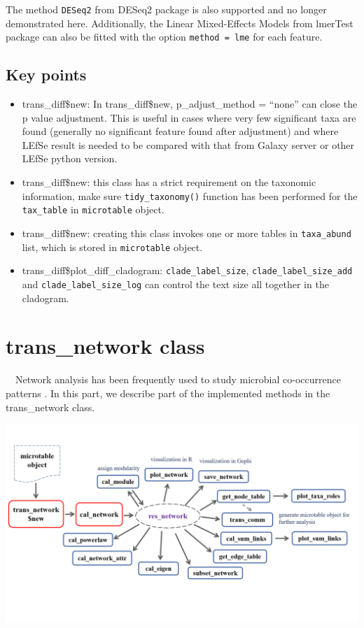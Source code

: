 \documentclass[
]{book}
\providecommand{\tightlist}{%
  \setlength{\itemsep}{0pt}\setlength{\parskip}{0pt}}
\begin{document}
The method \texttt{DESeq2} from DESeq2 package is also supported and no longer demonstrated here.
Additionally, the Linear Mixed-Effects Models from lmerTest package can also be fitted with the option \texttt{method\ =\ \textquotesingle{}lme\textquotesingle{}} for each feature.

\hypertarget{key-points-5}{%
\subsection{Key points}\label{key-points-5}}

\begin{itemize}
\tightlist
\item
  trans\_diff\$new: In trans\_diff\$new, p\_adjust\_method = ``none'' can close the p value adjustment.
  This is useful in cases where very few significant taxa are found (generally no significant feature found after adjustment) and
  where LEfSe result is needed to be compared with that from Galaxy server or other LEfSe python version.
\item
  trans\_diff\$new: this class has a strict requirement on the taxonomic information,
  make sure \texttt{tidy\_taxonomy()} function has been performed for the \texttt{tax\_table} in \texttt{microtable} object.
\item
  trans\_diff\$new: creating this class invokes one or more tables in \texttt{taxa\_abund} list, which is stored in \texttt{microtable} object.
\item
  trans\_diff\$plot\_diff\_cladogram: \texttt{clade\_label\_size}, \texttt{clade\_label\_size\_add} and \texttt{clade\_label\_size\_log} can control the text size all together in the cladogram.
\end{itemize}

\hypertarget{trans_network-class}{%
\section{trans\_network class}\label{trans_network-class}}

　Network analysis has been frequently used to study microbial co-occurrence patterns \citep{Deng_Molecular_2012, Faust_Microbial_2012, Coyte_Theecology_2015}.
In this part, we describe part of the implemented methods in the trans\_network class.

\begin{center}\includegraphics[width=8000px]{Images/network_framework} \end{center}
\end{document}
